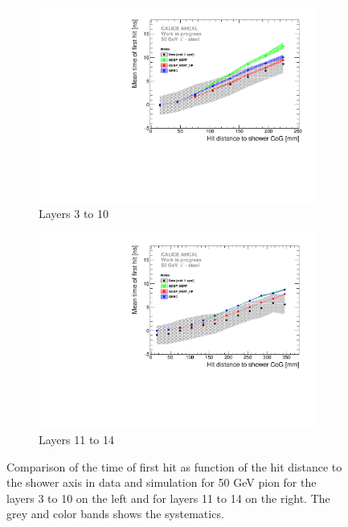 \begin{figure}[htbp!]
	\begin{subfigure}[t]{0.5\textwidth}
		\centering
		\includegraphics[width=1\textwidth]{../Thesis_Plots/Timing/Pions/Plots/ComparisonToSim/Time_Radius_50GeV_SSF_Mokka.pdf}
		\caption{Layers 3 to 10} \label{fig:Radius_SSF_SimData_50GeV}
	\end{subfigure}
	\hfill
	\begin{subfigure}[t]{0.5\textwidth}
		\centering
		\includegraphics[width=1\textwidth]{../Thesis_Plots/Timing/Pions/Plots/ComparisonToSim/Time_Radius_50GeV_BL_Mokka.pdf}
		\caption{Layers 11 to 14} \label{fig:Radius_BL_SimData_50GeV}
	\end{subfigure}
	\caption{Comparison of the time of first hit as function of the hit distance to the shower axis in data and \mokka simulation for 50 GeV pion for the layers 3 to 10 on the left and for layers 11 to 14 on the right. The grey and color bands shows the systematics.}
	\label{fig:Radius_SSF_SimData_50GeVComparison}
\end{figure}

